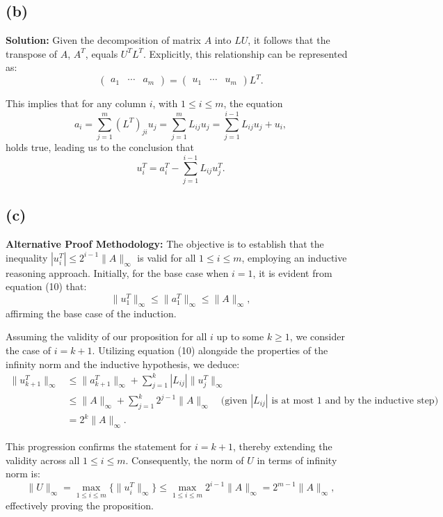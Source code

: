\documentclass{article}
\begin{document}
\subsection{(b)}
\textbf{Solution:} Given the decomposition of matrix \(A\) into \(L U\), it follows that the transpose of \(A\), \(A^T\), equals \(U^T L^T\). Explicitly, this relationship can be represented as:
\[
\begin{pmatrix}
a_1 & \cdots & a_m
\end{pmatrix}
= 
\begin{pmatrix}
u_1 & \cdots & u_m
\end{pmatrix}
L^T.
\]

This implies that for any column \(i\), with \(1 \leq i \leq m\), the equation
\[
a_i = \sum_{j=1}^m (L^T)_{ji} u_j = \sum_{j=1}^m L_{ij} u_j = \sum_{j=1}^{i-1} L_{ij} u_j + u_i,
\]
holds true, leading us to the conclusion that
\[
u_i^T = a_i^T - \sum_{j=1}^{i-1} L_{ij} u_j^T.
\]
\subsection{(c)}
\textbf{Alternative Proof Methodology:} The objective is to establish that the inequality \(|u_i^T| \leq 2^{i-1}\|A\|_{\infty}\) is valid for all \(1 \leq i \leq m\), employing an inductive reasoning approach. Initially, for the base case when \(i=1\), it is evident from equation (10) that:
\[
\|u_1^T\|_{\infty} \leq \|a_1^T\|_{\infty} \leq \|A\|_{\infty},
\]
affirming the base case of the induction.

Assuming the validity of our proposition for all \(i\) up to some \(k \geq 1\), we consider the case of \(i=k+1\). Utilizing equation (10) alongside the properties of the infinity norm and the inductive hypothesis, we deduce:
\[
\begin{aligned}
\|u_{k+1}^T\|_{\infty} &\leq \|a_{k+1}^T\|_{\infty} + \sum_{j=1}^{k} |L_{ij}| \|u_j^T\|_{\infty} \\
&\leq \|A\|_{\infty} + \sum_{j=1}^{k} 2^{j-1}\|A\|_{\infty} \quad \text{(given \(|L_{ij}|\) is at most 1 and by the inductive step)} \\
&= 2^k\|A\|_{\infty}.
\end{aligned}
\]

This progression confirms the statement for \(i=k+1\), thereby extending the validity across all \(1 \leq i \leq m\). Consequently, the norm of \(U\) in terms of infinity norm is:
\[
\|U\|_{\infty} = \max_{1 \leq i \leq m} \{\|u_i^T\|_{\infty}\} \leq \max_{1 \leq i \leq m} 2^{i-1}\|A\|_{\infty} = 2^{m-1}\|A\|_{\infty},
\]
effectively proving the proposition.
\end{document}
